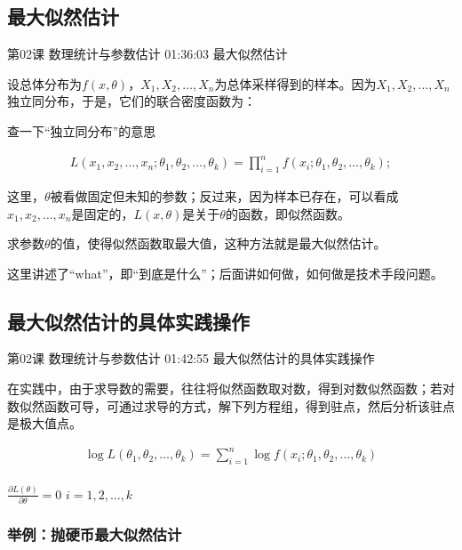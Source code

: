 \documentclass[UTF8]{ctexbook}
\begin{document}
\subsection{最大似然估计}

第02课 数理统计与参数估计 01:36:03 最大似然估计

设总体分布为$f(x,\theta)$，$X_ {1},X_{2},\dots,X_{n}$为总体采样得到的样本。因为$X_ {1},X_{2},\dots,X_{n}$独立同分布，于是，它们的联合密度函数为：

查一下“独立同分布”的意思

\begin{equation}
\begin{aligned}
L(x_{1},x_{2},\dots,x_{n};\theta_{1},\theta_{2},\dots,\theta_{k})
=\prod_{i=1}^{n} f(x_{i};\theta_{1},\theta_{2},\dots,\theta_{k});
\end{aligned}
\end{equation}

这里，$\theta$被看做固定但未知的参数；反过来，因为样本已存在，可以看成$x_{1},x_{2},\dots,x_{n}$是固定的，$L(x,\theta)$是关于$\theta$的函数，即似然函数。

求参数$\theta$的值，使得似然函数取最大值，这种方法就是最大似然估计。

这里讲述了“what”，即“到底是什么”；后面讲如何做，如何做是技术手段问题。

\subsection{最大似然估计的具体实践操作}

第02课 数理统计与参数估计 01:42:55 最大似然估计的具体实践操作

在实践中，由于求导数的需要，往往将似然函数取对数，得到对数似然函数；若对数似然函数可导，可通过求导的方式，解下列方程组，得到驻点，然后分析该驻点是极大值点。

\begin{equation}
\begin{aligned}
\log L(\theta_{1},\theta_{2},\dots,\theta_{k})
=\sum_{i=1}^{n} \log f(x_{i};\theta_{1},\theta_{2},\dots,\theta_{k}) \\
\end{aligned}
\end{equation}


$\frac{\partial L(\theta)}{\partial \theta}=0$ \quad $i=1,2,\dots,k$

\subsubsection{举例：抛硬币最大似然估计}
\end{document}
